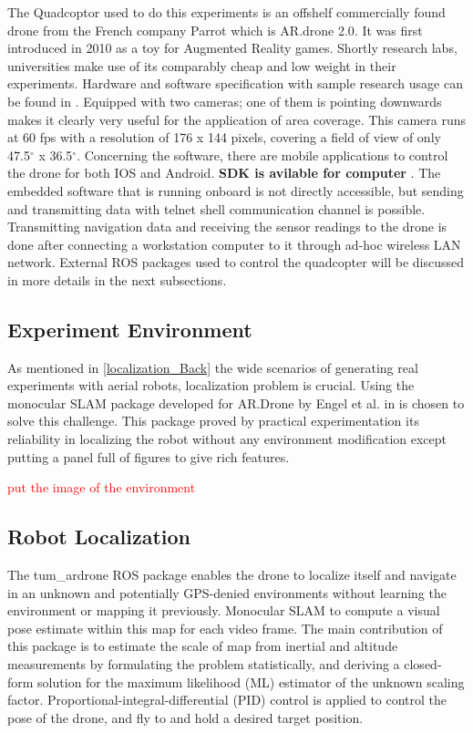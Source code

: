 The Quadcoptor used to do this experiments is an offshelf commercially found drone from the French company Parrot which is AR.drone 2.0. It was first introduced in 2010 as a toy for Augmented Reality games. Shortly research labs, universities make use of its comparably cheap and low weight in their experiments. Hardware and software specification with sample research usage can be found in \cite{Ardrone1,Ardrone2}. Equipped with two cameras; one of them is pointing downwards makes it clearly very useful for the application of area coverage. This camera runs at 60 fps with a resolution of 176 x 144 pixels, covering a field of view of only 47.5$^{\circ}$ x 36.5$^{\circ}$. Concerning the software, there are mobile applications to control the drone for both IOS and Android. \textbf{SDK is avilable for computer} . The embedded software that is running onboard is not directly accessible, but sending and transmitting data with telnet shell communication channel is possible. Transmitting navigation data and receiving the sensor readings to the drone is done after connecting a workstation computer to it through ad-hoc wireless LAN network. External ROS packages used to control the quadcopter will be discussed in more details in the next subsections.


\subsection{Experiment Environment}

As mentioned in \ref{localization_Back} the wide scenarios of generating real experiments with aerial robots, localization problem is crucial. Using the monocular SLAM package developed for AR.Drone by Engel et al. in \cite{engel14ras,engel12iros}  is chosen to solve this challenge. This package proved by practical experimentation its reliability in localizing the robot without any environment modification except putting a panel full of figures to give rich features.

\textcolor{red}{put the image of the environment}


\subsection{Robot Localization }

The tum\_ardrone ROS package enables the drone to localize itself  and navigate in an unknown and potentially GPS-denied environments without learning the environment or mapping it previously. Monocular SLAM to compute a visual pose estimate within this map for each video frame. The main contribution of this package is to estimate the scale of map from inertial and altitude measurements by formulating the problem statistically, and deriving a closed-form solution for the maximum likelihood (ML) estimator of the unknown scaling factor. Proportional-integral-differential (PID) control is applied to control the pose of the drone, and fly to and hold a desired target position.


